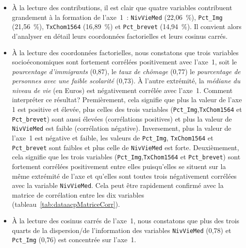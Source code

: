 \documentclass[
  11pt,
  french,
]{book}
\begin{document}
\begin{itemize}
\item
  À la lecture des contributions, il est clair que quatre variables contribuent grandement à la formation de l'axe~1~: \texttt{NivVieMed} (22,06~\%),
  \texttt{Pct\_Img} (21,56~\%), \texttt{TxChom1564} (16,89~\%) et \texttt{Pct\_brevet} (14,94~\%). Il convient alors d'analyser en détail leurs coordonnées factorielles et leurs cosinus carrés.
\item
  À la lecture des coordonnées factorielles, nous constatons que trois variables socioéconomiques sont fortement corrélées positivement avec l'axe~1, soit le \emph{pourcentage d'immigrants} (0,87), le \emph{taux de chômage} (0,77) le \emph{pourcentage de personnes avec une faible scolarité} (0,73). À l'autre extrémité, la \emph{médiane du niveau de vie} (en Euros) est négativement corrélée avec l'axe~1. Comment interpréter ce résultat? Premièrement, cela signifie que plus la valeur de l'axe 1 est positive et élevée, plus celles des trois variables (\texttt{Pct\_Img},\texttt{TxChom1564} et \texttt{Pct\_brevet}) sont aussi élevées (corrélations positives) et plus la valeur de \texttt{NivVieMed} est faible (corrélation négative). Inversement, plus la valeur de l'axe~1 est négative et faible, les valeurs de \texttt{Pct\_Img}, \texttt{TxChom1564} et \texttt{Pct\_brevet} sont faibles et plus celle de \texttt{NivVieMed} est forte. Deuxièmement, cela signifie que les trois variables (\texttt{Pct\_Img},\texttt{TxChom1564} et \texttt{Pct\_brevet}) sont fortement corrélées positivement entre elles puisqu'elles se situent sur la même extrémité de l'axe et qu'elles sont toutes trois négativement corrélées avec la variable \texttt{NivVieMed}. Cela peut être rapidement confirmé avec la matrice de corrélation entre les dix variables (tableau~\ref{tab:dataacpMatriceCorr}).
\item
  À la lecture des cosinus carrés de l'axe~1, nous constatons que plus des trois quarts de la dispersion/de l'information des variables \texttt{NivVieMed} (0,78) et \texttt{Pct\_Img} (0,76) est concentrée sur l'axe~1.
\end{itemize}
\end{document}
